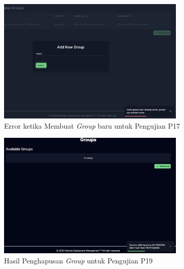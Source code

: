 \begin{figure}[ht]
  \centering
  \includegraphics[width=0.8\textwidth]{resources/chapter-4/pengujian/p17.jpg}
  \caption{Error ketika Membuat \textit{Group} baru untuk Pengujian P17}
  \label{fig:pengujian-p17}
\end{figure}

\begin{figure}[ht]
  \centering
  \includegraphics[width=0.8\textwidth]{resources/chapter-4/pengujian/p19.jpg}
  \caption{Hasil Penghapusan \textit{Group} untuk Pengujian P19}
  \label{fig:pengujian-p19}
\end{figure}
